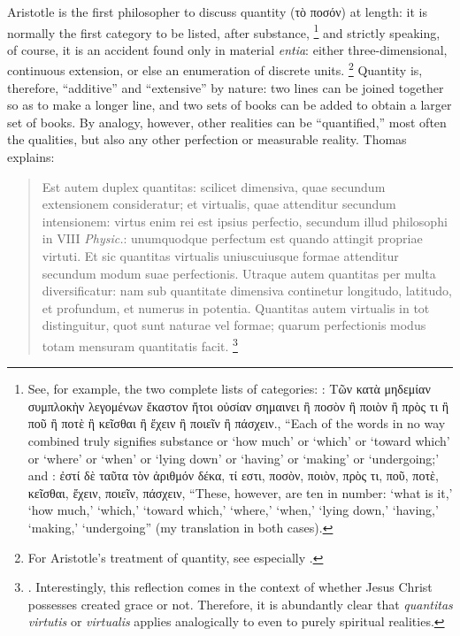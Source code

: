 Aristotle is the first philosopher to discuss quantity (τὸ ποσόν) at length: it is normally the first category to be listed, after substance,%
%
\footnote{See, for example, the two complete lists of categories: \cite[I, 1b25-2a4]{aristotle:categories}: Τῶν κατὰ μηδεμίαν συμπλοκὴν λεγομένων ἕκαστον ἤτοι οὐσίαν σημαινει ἢ ποσὸν ἢ ποιὸν ἢ πρὸς τι ἢ ποῦ ἢ ποτὲ ἢ κεῖσθαι ἢ ἔχειν ἢ ποιεῖν ἢ πάσχειν., “Each of the words in no way combined truly signifies substance or ‘how much’ or ‘which’ or ‘toward which’ or ‘where’ or ‘when’ or ‘lying down’ or ‘having’ or ‘making’ or ‘undergoing;’ and \cite[Α, 9, 103b23–24]{aristotle:topics}: ἐστί δὲ ταῦτα τὸν ἀριθμόν δέκα, τί εστι, ποσὸν, ποιὸν, πρὸς τι, ποῦ, ποτὲ, κεῖσθαι, ἔχειν, ποιεῖν, πάσχειν, “These, however, are ten in number: ‘what is it,’ ‘how much,’ ‘which,’ ‘toward which,’ ‘where,’ ‘when,’ ‘lying down,’ ‘having,’ ‘making,’ ‘undergoing” (my translation in both cases).}
%
and strictly speaking, of course, it is an accident found only in material \emph{entia}: either three-dimensional, continuous extension, or else an enumeration of discrete units.%
%
\footnote{For Aristotle’s treatment of quantity, see especially \cite[Ζ, 4b20-2a35]{aristotle:categories}.}
%
Quantity is, therefore, “additive” and “extensive” by nature: two lines can be joined together so as to make a longer line, and two sets of books can be added to obtain a larger set of books. By analogy, however, other realities can be “quantified,” most often the qualities, but also any other perfection or measurable reality. Thomas explains:
\begin{quotation}
Est autem duplex quantitas: scilicet dimensiva, quae secundum extensionem consideratur; et virtualis, quae attenditur secundum intensionem: virtus enim rei est ipsius perfectio, secundum illud philosophi in VIII \emph{Physic.}: unumquodque perfectum est quando attingit propriae virtuti. Et sic quantitas virtualis uniuscuiusque formae attenditur secundum modum suae perfectionis. Utraque autem quantitas per multa diversificatur: nam sub quantitate dimensiva continetur longitudo, latitudo, et profundum, et numerus in potentia. Quantitas autem virtualis in tot distinguitur, quot sunt naturae vel formae; quarum perfectionis modus totam mensuram quantitatis facit.%
%
\footnote{\Cite[29, 3]{st:deveritate}. Interestingly, this reflection comes in the context of whether Jesus Christ possesses created grace or not. Therefore, it is abundantly clear that \emph{quantitas virtutis} or \emph{virtualis} applies analogically to even to purely spiritual realities.}
\end{quotation}
